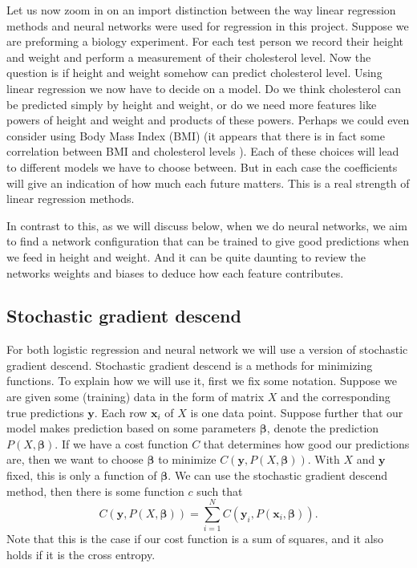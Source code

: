 \documentclass[parskip=half]{scrartcl}
\theoremstyle{definition}
\theoremstyle{remark}
\newcommand{\vect}[1]{{\bm{#1}}}
\begin{document}
Let us now zoom in on an import distinction between the way linear regression methods and neural networks were used for regression in this project.  
Suppose we are preforming a biology experiment.
For each test person we record their height and weight and perform a measurement of their cholesterol level. 
Now the question is if height and weight somehow can predict cholesterol level. 
Using linear regression we now have to decide on a model.
Do we think cholesterol can be predicted simply by height and weight, or do we need more features like powers of height and weight and products of these powers. 
Perhaps we could even consider using Body Mass Index (BMI) (it appears that there is in fact some correlation between BMI and cholesterol levels \cite{somepaper}).
Each of these choices will lead to different models we have to choose between.
But in each case the coefficients will give an indication of how much each future matters.
This is a real strength of linear regression methods. 

In contrast to this, as we will discuss below, when we do neural networks, we aim to find a network configuration that can be trained to give good predictions when we feed in height and weight. 
And it can be quite daunting to review the networks weights and biases to deduce how each feature contributes.     

\subsection{Stochastic gradient descend} \label{sec:sgd}

For both logistic regression and neural network we will use a version of stochastic gradient descend. 
Stochastic gradient descend is a methods for minimizing functions.
To explain how we will use it, first we fix some notation. 
Suppose we are given some (training) data in the form of matrix $X$ and the corresponding true predictions $\vect{y}$. 
Each row $\vect{x}_i$ of $X$ is one data point. 
Suppose further that our model makes prediction based on some parameters $\vect{\beta}$, denote the prediction $P(X, \vect{\beta})$. 
If we have a cost function $C$ that determines how good our predictions are, then we want to choose $\vect{\beta}$ to minimize $C(\vect{y}, P(X, \vect{\beta}))$.   
With $X$ and $\vect{y}$ fixed, this is only a function of $\vect{\beta}$. 
We can use the stochastic gradient descend method, then there is some function $c$ such that 
\[
	C(\vect{y}, P(X, \vect{\beta})) = \sum_{i=1}^N C(\vect{y}_i, P(\vect{x}_i, \vect{\beta})).
\] 
Note that this is the case if our cost function is a sum of squares, and it also holds if it is the cross entropy. 
\end{document}
